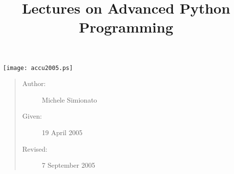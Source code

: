 \documentclass[10pt,a4paper,english]{article}
\title{Lectures on Advanced Python Programming}
\author{}
\date{}
\newlength{\locallinewidth}
\begin{document}
\maketitle


\setlength{\locallinewidth}{\linewidth}

\texttt{[image: accu2005.ps]}
\begin{quote}
\begin{description}
\item [Author:]
Michele Simionato


\item [Given:]
19 April 2005


\item [Revised:]
7 September 2005


\end{description}
\end{quote}
\hypertarget{contents}{}
\end{document}
